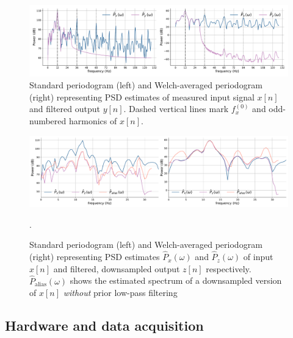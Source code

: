 \begin{figure}[h]
    \centering
    \includegraphics[width=\textwidth]{sq_wave_filtering_spectra}
    \caption[PSD estimates of a measured input signal and its filtered output]{Standard periodogram (left) and Welch-averaged periodogram (right) representing PSD estimates of measured input signal $x[n]$ and filtered output $y[n]$. Dashed vertical lines mark $f_x^{(0)}$ and odd-numbered harmonics of $x[n]$.}
    \label{fig:sq-wave-spectra-c6}
\end{figure}

\begin{figure}[h]
    \centering
    \includegraphics[width=\textwidth]{sq_wave_filtering_ds_spectra}
    \caption[PSD estimates of an input signal, filtered and downsampled version and a downsampled version without filtering.]{Standard periodogram (left) and Welch-averaged periodogram (right) representing PSD estimates $\hat{P}_x(\omega)$ and $\hat{P}_z(\omega)$ of input $x[n]$ and filtered, downsampled output $z[n]$ respectively. $\hat{P}_{\text{alias}}(\omega)$ shows the estimated spectrum of a downsampled version of $x[n]$ \textit{without} prior low-pass filtering}.
    \label{fig:sq-wave-ds-spectra-c6}
\end{figure}

\subsection{Hardware and data acquisition}


